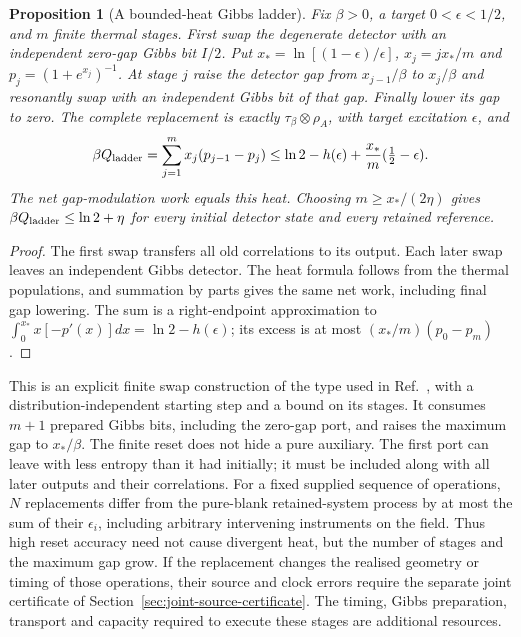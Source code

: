 \documentclass[12pt,a4paper]{article}
\newtheorem{proposition}[theorem]{Proposition}
\begin{document}
\begin{proposition}[A bounded-heat Gibbs ladder]
\label{prop:thermal-reset-ladder}
Fix $\beta>0$, a target $0<\epsilon<1/2$, and $m$ finite thermal stages.
First swap the degenerate detector with an independent zero-gap Gibbs bit
$I/2$. Put $x_*=\ln[(1-\epsilon)/\epsilon]$,
$x_j=jx_*/m$ and $p_j=(1+e^{x_j})^{-1}$.
At stage $j$ raise the detector gap from $x_{j-1}/\beta$ to $x_j/\beta$
and resonantly swap with an independent Gibbs bit of that gap.
Finally lower its gap to zero. The complete replacement is exactly
$\tau_\beta\otimes\rho_A$, with target excitation $\epsilon$, and
\begin{equation}\label{eq:thermal-ladder-heat}
 \beta Q_{\rm ladder}
 =\sum_{j=1}^m x_j(p_{j-1}-p_j)
 \le\ln2-h(\epsilon)+\frac{x_*}{m}(\tfrac12-\epsilon).
\end{equation}
The net gap-modulation work equals this heat.
Choosing $m\ge x_*/(2\eta)$ gives $\beta Q_{\rm ladder}\le\ln2+\eta$
for every initial detector state and every retained reference.
\end{proposition}
\begin{proof}
The first swap transfers all old correlations to its output.
Each later swap leaves an independent Gibbs detector.
The heat formula follows from the thermal populations, and summation by
parts gives the same net work, including final gap lowering.
The sum is a right-endpoint approximation to
$\int_0^{x_*}x[-p'(x)]dx=\ln2-h(\epsilon)$;
its excess is at most $(x_*/m)(p_0-p_m)$.
\end{proof}
This is an explicit finite swap construction of the type used in
Ref.~\cite[Sec.~6]{ReebWolf2014}, with a distribution-independent starting
step and a bound on its stages. It consumes $m+1$ prepared Gibbs bits,
including the zero-gap port, and raises the maximum gap to $x_*/\beta$.
The finite reset does not hide a pure auxiliary. The first port can leave
with less entropy than it had initially; it must be included along with all
later outputs and their correlations. For a fixed supplied sequence of
operations, $N$ replacements differ from the pure-blank retained-system
process by at most the sum of their $\epsilon_i$, including arbitrary
intervening instruments on the field. Thus high reset accuracy need not
cause divergent heat, but the number of stages and the maximum gap grow.
If the replacement changes the realised geometry or timing of those
operations, their source and clock errors require the separate joint
certificate of Section~\ref{sec:joint-source-certificate}.
The timing, Gibbs preparation, transport and capacity required to execute
these stages are additional resources.
\end{document}
